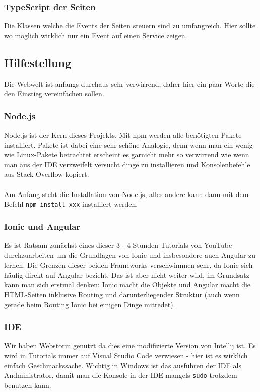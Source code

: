 \subsubsection*{TypeScript der Seiten}
Die Klassen welche die Events der Seiten steuern sind zu umfangreich. Hier sollte wo möglich wirklich nur ein Event auf einen Service zeigen.

\subsection{Hilfestellung}
Die Webwelt ist anfangs durchaus sehr verwirrend, daher hier ein paar Worte die den Einstieg vereinfachen sollen.

\subsubsection*{Node.js}
Node.js ist der Kern dieses Projekts. Mit npm werden alle benötigten Pakete installiert. \glqq Pakete\grqq{} ist dabei eine sehr schöne Analogie, denn wenn man ein wenig wie Linux-Pakete betrachtet erscheint es garnicht mehr so verwirrend wie wenn man aus der IDE verzweifelt versucht dinge zu installieren und Konsolenbefehle aus Stack Overflow kopiert.\\\\
Am Anfang steht die Installation von Node.js, alles andere kann dann mit dem Befehl \verb|npm install xxx| installiert werden.

\subsubsection*{Ionic und Angular}
Es ist Ratsam zunächst eines dieser 3 - 4 Stunden Tutorials von YouTube durchzuarbeiten um die Grundlagen von Ionic und insbesondere auch Angular zu lernen. Die Grenzen dieser beiden Frameworks verschwimmen sehr, da Ionic sich häufig direkt auf Angular bezieht. Das ist aber nicht weiter wild, im Grundsatz kann man sich erstmal denken: Ionic macht die Objekte und Angular macht die HTML-Seiten inklusive Routing und darunterliegender Struktur (auch wenn gerade beim Routing Ionic bei einigen Dinge mitredet).

\subsubsection*{IDE}
Wir haben Webstorm genutzt da dies eine modifizierte Version von Intellij ist. Es wird in Tutorials immer auf Visual Studio Code verwiesen - hier ist es wirklich einfach Geschmackssache. Wichtig in Windows ist das ausführen der IDE als Andministrator, damit man die Konsole in der IDE mangels \verb|sudo| trotzdem benutzen kann.

